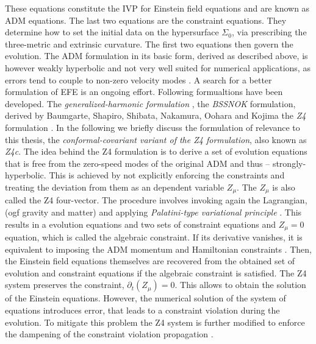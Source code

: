 {    %
    These equations constitute the IVP for Einstein field equations and are known as ADM equations. The last two equations are the constraint equations. They determine how to set the initial data on the hypersurface $\Sigma_0$, via prescribing the three-metric and extrinsic curvature. The first two equations then govern the evolution.
    The ADM formulation in its basic form, derived as described above, is however weakly hyperbolic \cite{Baumgarte:2002jm} and not very well suited for numerical applications, as errors tend to couple to non-zero velocity modes \cite{Alcubierre:1999rt}.
    A search for a better formulation of EFE is an ongoing effort. Following formualtions have been developed. 
    The \textit{generalized-harmonic formulation} \cite{Friedrich:1985,Lindblom:2005qh,Lindblom:2009}, 
    the \textit{BSSNOK} formulation, derived by Baumgarte, Shapiro, Shibata, Nakamura, Oohara and Kojima \cite{Nakamura1987,Shibata:1995we,Baumgarte:1998te} 
    the \textit{Z4} formulation \cite{Bona:2003fj,Bernuzzi:2009ex,Ruiz:2010qj,Weyhausen:2011cg,Alic:2011gg}.
    In the following we briefly discuss the formulation of relevance to this thesis, the \textit{conformal-covariant variant of the Z4 formulation}, also known as \textit{Z4c}.
    The idea behind the Z4 formulation is to derive a set of evolution equations that is free from the zero-speed modes of the original ADM and thus -- strongly-hyperbolic. 
    This is achieved by not explicitly enforcing the constraints and treating the deviation from them as an dependent variable $Z_{\mu}$. The $Z_{\mu}$ is also called the Z4 four-vector.
    The procedure involves invoking again the Lagrangian, (ogf gravity and matter) and applying \textit{Palatini-type variational principle} \cite{Bona:2010is}. This results in a evolution equations and two sets of constraint equations and $Z_{\mu}=0$ equation, which is called the algebraic constraint. If its derivative vanishes, it is equivalent to imposing the ADM momentum and Hamiltonian constraints \cite{Bona:2009}. 
    Then, the Einstein field equations themselves are recovered from the obtained set of evolution and constraint equations if the algebraic constraint is satisfied.
    The Z4 system preserves the constraint, $\partial_t (Z_{\mu})= 0$. This allows to obtain the solution of the Einstein equations. 
    However, the numerical solution of the system of equations introduces error, that leads to a constraint violation during the evolution. To mitigate this problem the Z4 system is further modified to enforce the dampening of the constraint violation propagation \cite{Gundlach:2005eh}.
}
